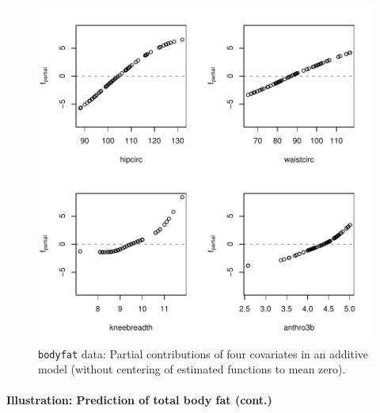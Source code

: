 \documentclass{article}
\newcommand{\Robject}[1]{\texttt{#1}}
\begin{document}
\begin{figure}[t]
\begin{center}
\includegraphics{figures/BH-bodyfat-gamboost-plot}
\caption{\Robject{bodyfat} data: Partial contributions of four covariates
  in an additive model (without centering of estimated functions to mean
  zero).    
         \label{bodyfat-gamboost-plot}}
\end{center}
\end{figure}

 

\paragraph{Illustration: Prediction of total body fat (cont.)}

\end{document}
